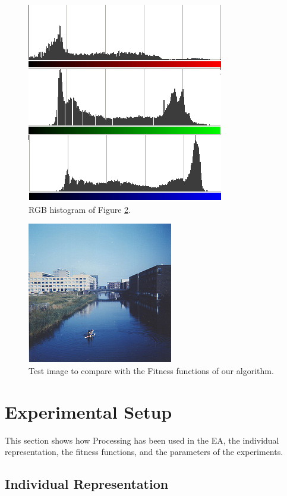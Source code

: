 \begin{figure}
\centering
   \includegraphics[scale =0.6] {gfx/art/histogram.png}
\caption{RGB histogram of Figure \ref{fig:flevopark}. }
\label{fig:histogram}
\end{figure}

\begin{figure}
\centering
   \includegraphics[scale =3] {gfx/art/flevopark.jpg}
\caption{Test image to compare with the Fitness functions of our algorithm.}
\label{fig:flevopark}
\end{figure}

\section{Experimental Setup}
\label{sec:setup}

\noindent This section shows how Processing has been used in the EA,
the individual representation, the fitness functions, and the
parameters of the experiments. 



\subsection{Individual Representation}

